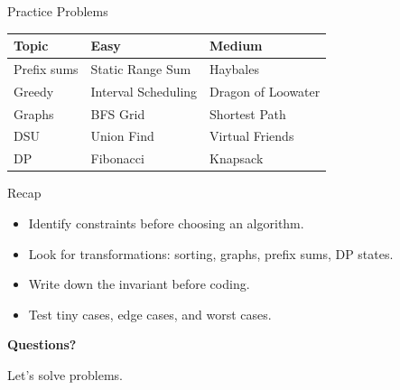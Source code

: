 \documentclass[aspectratio=169,11pt]{beamer}
\begin{document}
\begin{frame}{Practice Problems}
  \begin{tabular}{@{}lll@{}}
    \toprule
    Topic & Easy & Medium \\
    \midrule
    Prefix sums & Static Range Sum & Haybales \\
    Greedy & Interval Scheduling & Dragon of Loowater \\
    Graphs & BFS Grid & Shortest Path \\
    DSU & Union Find & Virtual Friends \\
    DP & Fibonacci & Knapsack \\
    \bottomrule
  \end{tabular}
\end{frame}

\begin{frame}{Recap}
  \begin{itemize}
    \item Identify constraints before choosing an algorithm.
    \item Look for transformations: sorting, graphs, prefix sums, DP states.
    \item Write down the invariant before coding.
    \item Test tiny cases, edge cases, and worst cases.
  \end{itemize}
\end{frame}

\begin{frame}[plain]
  \begin{center}
    {\Huge\bfseries Questions?}

    \vspace{0.5cm}
    {\Large Let’s solve problems.}
  \end{center}
\end{frame}
\end{document}
